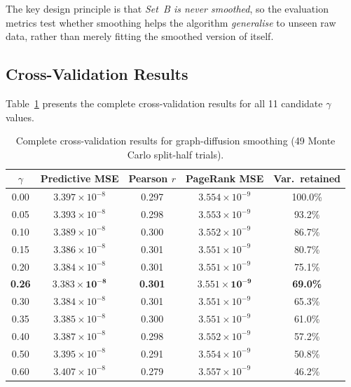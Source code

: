 \documentclass[12pt,a4paper]{article}
\theoremstyle{definition}
\theoremstyle{plain}
\begin{document}
The key design principle is that \emph{Set~B is never smoothed}, so the evaluation
metrics test whether smoothing helps the algorithm \emph{generalise} to unseen raw data,
rather than merely fitting the smoothed version of itself.

\subsection{Cross-Validation Results}
\label{sec:cv_results}

Table~\ref{tab:smoothing_full} presents the complete cross-validation results for all
11 candidate $\gamma$ values.

\begin{table}[H]
  \centering
  \caption{Complete cross-validation results for graph-diffusion smoothing
    (49 Monte Carlo split-half trials).}
  \label{tab:smoothing_full}
  \begin{tabular}{@{}ccccc@{}}
    \toprule
    $\gamma$ & Predictive MSE & Pearson $r$ & PageRank MSE & Var.\ retained\\
    \midrule
    0.00 & $3.397 \times 10^{-8}$ & 0.297 & $3.554 \times 10^{-9}$ & 100.0\%\\
    0.05 & $3.393 \times 10^{-8}$ & 0.298 & $3.553 \times 10^{-9}$ & 93.2\%\\
    0.10 & $3.389 \times 10^{-8}$ & 0.300 & $3.552 \times 10^{-9}$ & 86.7\%\\
    0.15 & $3.386 \times 10^{-8}$ & 0.301 & $3.551 \times 10^{-9}$ & 80.7\%\\
    0.20 & $3.384 \times 10^{-8}$ & 0.301 & $3.551 \times 10^{-9}$ & 75.1\%\\
    \textbf{0.26} & $\mathbf{3.383 \times 10^{-8}}$ & \textbf{0.301} & $\mathbf{3.551 \times 10^{-9}}$ & \textbf{69.0\%}\\
    0.30 & $3.384 \times 10^{-8}$ & 0.301 & $3.551 \times 10^{-9}$ & 65.3\%\\
    0.35 & $3.385 \times 10^{-8}$ & 0.300 & $3.551 \times 10^{-9}$ & 61.0\%\\
    0.40 & $3.387 \times 10^{-8}$ & 0.298 & $3.552 \times 10^{-9}$ & 57.2\%\\
    0.50 & $3.395 \times 10^{-8}$ & 0.291 & $3.554 \times 10^{-9}$ & 50.8\%\\
    0.60 & $3.407 \times 10^{-8}$ & 0.279 & $3.557 \times 10^{-9}$ & 46.2\%\\
    \bottomrule
  \end{tabular}
\end{table}
\end{document}
